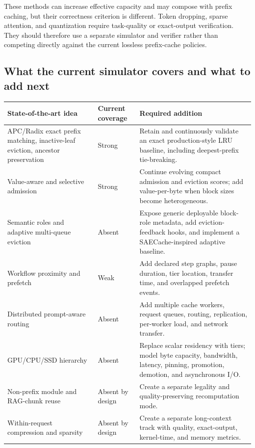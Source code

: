 \documentclass[11pt]{article}
\begin{document}
These methods can increase effective capacity and may compose with prefix caching, but
their correctness criterion is different.  Token dropping, sparse attention, and
quantization require task-quality or exact-output verification.  They should therefore
use a separate simulator and verifier rather than competing directly against the current
lossless prefix-cache policies.

\subsection{What the current simulator covers and what to add next}

\begin{longtable}{>{\raggedright\arraybackslash}p{}
                  >{\raggedright\arraybackslash}p{}
                  >{\raggedright\arraybackslash}p{}}
\toprule
\textbf{State-of-the-art idea} & \textbf{Current coverage} &
\textbf{Required addition} \\
\midrule
\endhead
APC/Radix exact prefix matching, inactive-leaf eviction, ancestor preservation &
Strong &
Retain and continuously validate an exact production-style LRU baseline, including
deepest-prefix tie-breaking. \\
Value-aware and selective admission &
Strong &
Continue evolving compact admission and eviction scores; add value-per-byte when block
sizes become heterogeneous. \\
Semantic roles and adaptive multi-queue eviction &
Absent &
Expose generic deployable block-role metadata, add eviction-feedback hooks, and
implement a SAECache-inspired adaptive baseline. \\
Workflow proximity and prefetch &
Weak &
Add declared step graphs, pause duration, tier location, transfer time, and overlapped
prefetch events. \\
Distributed prompt-aware routing &
Absent &
Add multiple cache workers, request queues, routing, replication, per-worker load, and
network transfer. \\
GPU/CPU/SSD hierarchy &
Absent &
Replace scalar residency with tiers; model byte capacity, bandwidth, latency, pinning,
promotion, demotion, and asynchronous I/O. \\
Non-prefix module and RAG-chunk reuse &
Absent by design &
Create a separate legality and quality-preserving recomputation mode. \\
Within-request compression and sparsity &
Absent by design &
Create a separate long-context track with quality, exact-output, kernel-time, and memory
metrics. \\
\bottomrule
\end{longtable}
\end{document}
